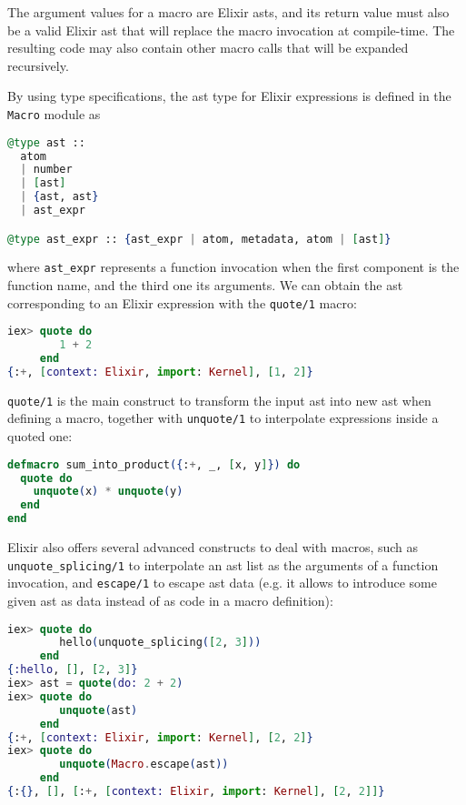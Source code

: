 The argument values for a macro are Elixir \gls{ast}s, and its return value must
also be a valid Elixir \gls{ast} that will replace the macro invocation at
compile-time. The resulting code may also contain other macro calls that will be
expanded recursively.

By using type specifications, the \gls{ast} type for Elixir expressions is
defined in the \verb|Macro| module as

\begin{lstlisting}[language=elixir,numbers=none,frame=none]
@type ast ::
  atom
  | number
  | [ast]
  | {ast, ast}
  | ast_expr

@type ast_expr :: {ast_expr | atom, metadata, atom | [ast]}
\end{lstlisting}

where \verb|ast_expr| represents a function invocation when the first component
is the function name, and the third one its arguments. We can obtain the
\gls{ast} corresponding to an Elixir expression with the \verb|quote/1| macro:

\begin{lstlisting}[language=elixir,numbers=none,frame=none]
iex> quote do 
        1 + 2
     end
{:+, [context: Elixir, import: Kernel], [1, 2]}
\end{lstlisting}

\verb|quote/1| is the main construct to transform the input \gls{ast} into new
\gls{ast} when defining a macro, together with \verb|unquote/1| to interpolate
expressions inside a quoted one:

\begin{lstlisting}[language=elixir,numbers=none,frame=none]
defmacro sum_into_product({:+, _, [x, y]}) do
  quote do
    unquote(x) * unquote(y)
  end
end
\end{lstlisting}

Elixir also offers several advanced constructs to deal with macros, such as
\verb|unquote_splicing/1| to interpolate an \gls{ast} list as the arguments of a
function invocation, and \verb|escape/1| to escape \gls{ast} data (e.g. it
allows to introduce some given \gls{ast} as data instead of as code in a macro
definition):

\begin{lstlisting}[language=elixir,numbers=none,frame=none]
iex> quote do
        hello(unquote_splicing([2, 3]))
     end
{:hello, [], [2, 3]}
iex> ast = quote(do: 2 + 2)
iex> quote do
        unquote(ast)
     end
{:+, [context: Elixir, import: Kernel], [2, 2]}
iex> quote do 
        unquote(Macro.escape(ast))
     end
{:{}, [], [:+, [context: Elixir, import: Kernel], [2, 2]]}
\end{lstlisting}

